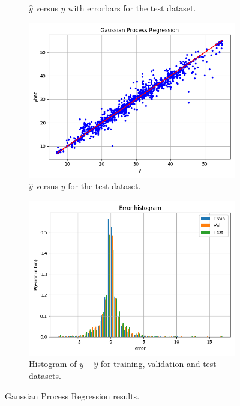\documentclass[12pt]{article}
\begin{document}
\begin{figure}
\begin{subfigure}{0.45\textwidth}
\caption{$\hat{y}$ versus $y$ with errorbars for the test dataset.}
\label{fig:GPR_regr_err}
\end{subfigure}
\begin{subfigure}{0.45\textwidth}
\includegraphics[width=\textwidth]{GP_regression.png}  
\caption{$\hat{y}$ versus $y$ for the test dataset.}
\label{fig:GPR_regr}
\end{subfigure}
\begin{subfigure}{0.45\textwidth}
\includegraphics[width=\textwidth]{GP_error_hist.png} \caption{Histogram of $y-\hat{y}$ for training, validation and test datasets.}
\label{fig:GPR_hist}
\end{subfigure}
\caption{Gaussian Process Regression results.}
\label{fig:GPR}
\end{figure}
\end{document}
